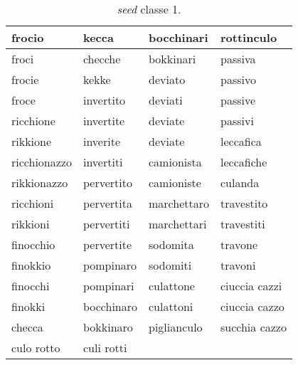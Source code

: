 \begin{table}[ht]
\centering
\begin{tabular}{|l|l|l|l|}
\hline
frocio       & kecca      & bocchinari  & rottinculo    \\ \hline
froci        & checche    & bokkinari   & passiva       \\ \hline
frocie       & kekke      & deviato     & passivo       \\ \hline
froce        & invertito  & deviati     & passive       \\ \hline
ricchione    & invertite  & deviate     & passivi       \\ \hline
rikkione     & inverite   & deviate     & leccafica     \\ \hline
ricchionazzo & invertiti  & camionista  & leccafiche    \\ \hline
rikkionazzo  & pervertito & camioniste  & culanda       \\ \hline
ricchioni    & pervertita & marchettaro & travestito    \\ \hline
rikkioni     & pervertiti & marchettari & travestiti    \\ \hline
finocchio    & pervertite & sodomita    & travone       \\ \hline
finokkio     & pompinaro  & sodomiti    & travoni       \\ \hline
finocchi     & pompinari  & culattone   & ciuccia cazzi \\ \hline
finokki      & bocchinaro & culattoni   & ciuccia cazzo \\ \hline
checca       & bokkinaro  & piglianculo & succhia cazzo \\ \hline
culo rotto   & culi rotti & & \\ \hline
\end{tabular}
\caption{\textit{seed} classe 1.}
\end{table}

